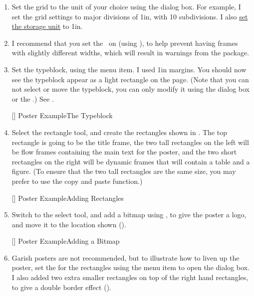 \begin{enumerate}
\item Set the grid to the unit of your choice using the
 dialog box. For example,
I set the grid settings to major divisions of 1in, with
10 subdivisions. I also
\hyperref[sec:controlsettings]{set the storage unit} to 1in.

\item I recommend that you set the \gridlock\ on (using
), to help prevent
having frames with slightly different widths, which will result
in warnings from the  package.

\item Set the \gls{typeblock}, using the
 menu item.
I used 1in margins. You should now see the typeblock appear
as a light  rectangle on the page. (Note that you can not
select or move the \gls{typeblock}, you can only modify it using the
 dialog box or the .)
See .

[]
{}
{Poster Example\dash The Typeblock}

\item Select the rectangle tool, and create the rectangles
shown in . The top rectangle is going to
be the title frame, the two tall rectangles on the left
will be flow frames containing the main text for the poster,
and the two short rectangles on the right will be dynamic frames
that will contain a table and a figure. (To ensure that the two tall
rectangles are the same size, you may prefer to use the copy and
paste function.)

[]
{}
{Poster Example\dash Adding Rectangles}

\item Switch to the select tool, and add a
\gls{bitmap} using
, to give the
poster a logo, and move it to the location shown
().

[]
{}
{Poster Example\dash Adding a Bitmap}

\item Garish posters are not recommended, but to illustrate how to
liven up the poster, set the  for the rectangles
using the  menu item to open
the  dialog box. I also added two
extra smaller rectangles on top of the right hand rectangles, to
give a double border effect ().


\end{enumerate}
